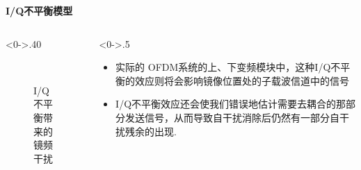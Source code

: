     \begin{frame}{\textbf{I/Q不平衡模型}}
    	\begin{columns}[T] %
    		\begin{column}<0->{.40\textwidth}
    			\begin{figure}[thpb]
    				\centering
    				$\quad$\caption{I/Q不平衡带来的镜频干扰}
    				\label{fig:campus}
    			\end{figure}
    		\end{column}%
    		\hfill%
    		\begin{column}<0->{.5\textwidth}
    			\begin{itemize}
    				\item 实际的 OFDM系统的上、下变频模块中，这种I/Q不平衡的效应则将会影响镜像位置处的子载波信道中的信号
    				\item I/Q不平衡效应还会使我们错误地估计需要去耦合的那部分发送信号，从而导致自干扰消除后仍然有一部分自干扰残余的出现. 
    			\end{itemize}
    		\end{column}%
    	\end{columns}
	\end{frame}

